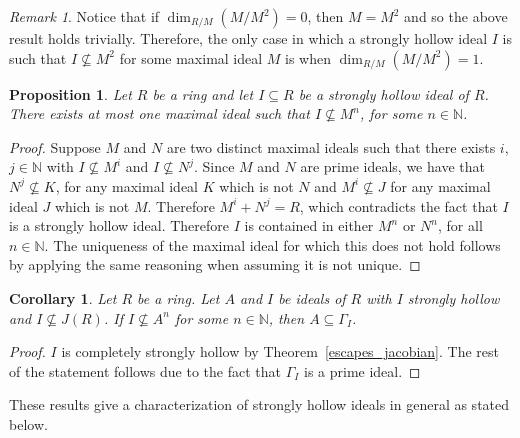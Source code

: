\documentclass[11pt,english]{amsart}
\newtheorem{proposition}[theorem]{Proposition}
\newtheorem{corollary}[theorem]{Corollary}
\theoremstyle{definition}
\numberwithin{equation}{section}
\theoremstyle{remark}
\newtheorem{remark}[theorem]{Remark}
\begin{document}
\begin{remark}
Notice that if $\dim_{R/M}(M/M^2)=0$, then $M=M^2$ and so the above result holds trivially. Therefore, the only case in which a strongly hollow ideal $I$ is such that $I\not\subseteq M^2$ for some maximal ideal $M$ is when $\dim_{R/M}(M/M^2)=1$. 	
\end{remark}

\begin{proposition}\label{comax_powers}
Let $R$ be a ring and let $I\subseteq R$ be a strongly hollow ideal of $R$. There exists at most one maximal ideal such that $I\not\subseteq M^n$, for some $n\in \mathds{N}$.
\end{proposition}

\begin{proof}
Suppose $M$ and $N$ are two distinct maximal ideals such that there exists $i$, $j\in\mathds{N}$ with $I\not\subseteq M^i$ and $I\not\subseteq N^j$. Since $M$ and $N$ are prime ideals, we have that $N^j\not\subseteq K$, for any maximal ideal $K$ which is not $N$ and $M^i\not\subseteq J$ for any maximal ideal $J$ which is not $M$. Therefore $M^i+N^j=R$, which contradicts the fact that $I$ is a strongly hollow ideal. Therefore $I$ is contained in either $M^n$ or $N^n$, for all $n\in\mathds{N}$. The uniqueness of the maximal ideal for which this does not hold follows by applying the same reasoning when assuming it is not unique.
\end{proof}

\begin{corollary}\label{A_contained_in_bad_M}
Let $R$ be a ring. Let $A$ and $I$ be ideals of $R$ with $I$ strongly hollow and $I\not\subseteq J(R)$. If $I\not\subseteq A^n$ for some $n\in\mathds{N}$, then $A\subseteq \Gamma_I$. 
\end{corollary}

\begin{proof}
$I$ is completely strongly hollow by Theorem~\ref{escapes_jacobian}. The rest of the statement follows due to the fact that $\Gamma_I$ is a prime ideal. 
\end{proof}

These results give a characterization of strongly hollow ideals in general as stated below.
 
\end{document}
